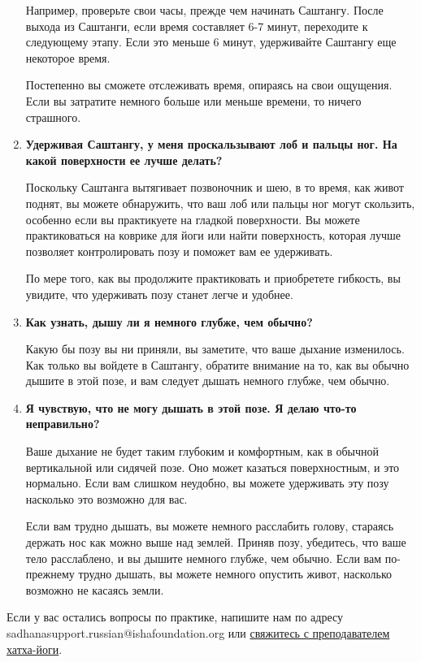 \documentclass[
a4paper, %
12pt, %
article,
onecolumn, %
openany, %
]{memoir}
\begin{document}
\begin{enumerate}
Например, проверьте свои часы, прежде чем начинать Саштангу. После выхода из Саштанги, если время составляет 6-7 минут, переходите к следующему этапу. Если это меньше 6 минут, удерживайте Саштангу еще некоторое время.

Постепенно вы сможете отслеживать время, опираясь на свои ощущения. Если вы
затратите немного больше или меньше времени, то ничего страшного.

\item \textbf{Удерживая Саштангу, у меня проскальзывают лоб и пальцы ног. На какой
    поверхности ее лучше делать?}

Поскольку Саштанга вытягивает позвоночник и шею, в то время, как живот поднят, вы
можете обнаружить, что ваш лоб или пальцы ног могут скользить, особенно если вы
практикуете на гладкой поверхности. Вы можете практиковаться на коврике для йоги
или найти поверхность, которая лучше позволяет контролировать позу и поможет вам
ее удерживать.

По мере того, как вы продолжите практиковать и приобретете гибкость, вы увидите, что
удерживать позу станет легче и удобнее.
\item \textbf{Как узнать, дышу ли я немного глубже, чем обычно?}

Какую бы позу вы ни приняли, вы заметите, что ваше дыхание изменилось. Как только
вы войдете в Саштангу, обратите внимание на то, как вы обычно дышите в этой позе, и
вам следует дышать немного глубже, чем обычно.

\item \textbf{Я чувствую, что не могу дышать в этой позе. Я делаю что-то неправильно?}

Ваше дыхание не будет таким глубоким и комфортным, как в обычной вертикальной
или сидячей позе. Оно может казаться поверхностным, и это нормально. Если вам
слишком неудобно, вы можете удерживать эту позу насколько это возможно для вас.

Если вам трудно дышать, вы можете немного расслабить голову, стараясь держать нос
как можно выше над землей.
Приняв позу, убедитесь, что ваше тело расслаблено, и вы дышите немного глубже, чем
обычно.
Если вам по-прежнему трудно дышать, вы можете немного опустить живот, насколько
возможно не касаясь земли.

\end{enumerate}

Если у вас остались вопросы по практике, напишите нам по адресу \\ 
sadhanasupport.russian@ishafoundation.org или \href{https://isha.sadhguru.org/in/en/yoga-meditation/yoga-teacher-training/hatha-yoga-teacher-training/teachers-in-your-area}{свяжитесь с преподавателем хатха-йоги}.
\end{document}
